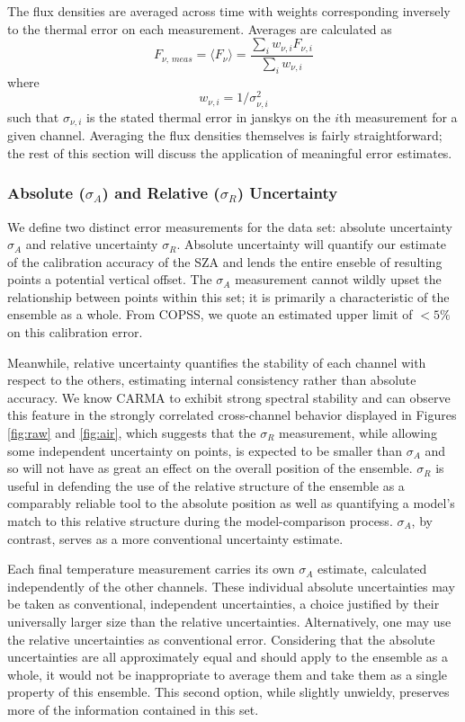 \documentclass{article}
\begin{document}
	The flux densities are averaged across time with weights corresponding inversely to the thermal error on each measurement.
	Averages are calculated as
	$$F_{\nu,\,meas} = \langle F_{\nu} \rangle = \frac{ \sum_{i} w_{\nu, i} F_{\nu,i} }{ \sum_{i} w_{\nu, i} }$$
	where $$w_{\nu, i} = 1/\sigma_{\nu, i}^{2}$$
	such that $\sigma_{\nu, i}$ is the stated thermal error in janskys on the $i$th measurement for a given channel.
	Averaging the flux densities themselves is fairly straightforward; the rest of this section will discuss the application
	of meaningful error estimates.

\subsubsection{Absolute ($\sigma_{A}$) and Relative ($\sigma_{R}$) Uncertainty} \label{s:error}
	We define two distinct error measurements for the data set: absolute uncertainty $\sigma_{A}$ and relative uncertainty $\sigma_{R}$.
	Absolute uncertainty will quantify our estimate of the calibration accuracy of the SZA and lends the entire enseble of resulting points a potential vertical offset.
	The $\sigma_{A}$ measurement cannot wildly upset the relationship between points within this set; it is primarily a characteristic of the ensemble as a whole.
	From COPSS, we quote an estimated upper limit of $<5\%$ on this calibration error.

	Meanwhile, relative uncertainty quantifies the stability of each channel with respect to the others, estimating internal consistency rather than absolute accuracy.
	We know CARMA to exhibit strong spectral stability and can observe this feature in the strongly correlated cross-channel behavior displayed in Figures \ref{fig:raw} and \ref{fig:air}, which suggests that the $\sigma_{R}$ measurement, while allowing some independent uncertainty on points, is expected to be smaller than $\sigma_{A}$ and so will not have as great an effect on the overall position of the ensemble.
	$\sigma_{R}$ is useful in defending the use of the relative structure of the ensemble as a comparably reliable tool to the absolute position as well as quantifying a model's match to this relative structure during the model-comparison process.
	$\sigma_{A}$, by contrast, serves as a more conventional uncertainty estimate.

	Each final temperature measurement carries its own $\sigma_{A}$ estimate, calculated independently of the other channels.
	These individual absolute uncertainties may be taken as conventional, independent uncertainties, a choice justified by their universally larger size than the relative uncertainties.
	Alternatively, one may use the relative uncertainties as conventional error.
	Considering that the absolute uncertainties are all approximately equal and should apply to the ensemble as a whole, it would not be inappropriate to average them and take them as a single property of this ensemble.
	This second option, while slightly unwieldy, preserves more of the information contained in this set.
\end{document}
